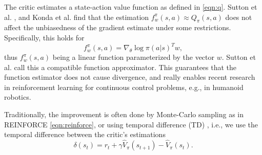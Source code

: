 \documentclass[conference, final]{IEEEtran}
\begin{document}
The critic estimates a state-action value function as defined in \eqref{eqn:q}. 
Sutton et al. \cite{Sutton:1999:PGM:3009657.3009806}, and Konda et al. \cite{Konda:2003:AA:942271.942292} find that the estimation $f_w^\pi(s,a) \approx Q_\pi(s,a)$ does not affect the unbiasedness of the gradient estimate under some restrictions. 
Specifically, this holds for 
\begin{equation}
	f_w^\pi(s,a) = {\nabla_\theta \log\pi(a|s)}^T w,
	\label{eqn:compatible-approximator}
\end{equation}
thus $f_w^\pi(s,a)$ being a linear function parameterized by the vector $w$.
Sutton et al. \cite{Sutton:1999:PGM:3009657.3009806} call this a compatible function approximator.
This guarantees that the function estimator does not cause divergence, and really enables recent research in reinforcement learning for continuous control problems, e.g., in humanoid robotics.

Traditionally, the improvement is often done by Monte-Carlo sampling as in REINFORCE \eqref{eqn:reinforce}, or using temporal difference (TD) \cite{Sutton1988}, i.e., we use the temporal difference between the critic's estimations 
\begin{equation}
  \delta(s_t) = r_t + \gamma \hat{V}_\pi(s_{t+1}) - \hat{V}_\pi(s_t).
  \label{eqn:td-error}
\end{equation}
\end{document}
